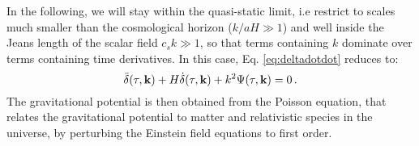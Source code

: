 In the following, we will stay within the quasi-static
limit, i.e restrict to scales much smaller than the cosmological horizon
($k/aH\gg1$) and well inside the Jeans length of the scalar field
$c_{s}k\gg1$, so that terms containing $k$ dominate over terms containing
time derivatives. In this case, Eq. \ref{eq:deltadotdot} reduces
to: 
\begin{equation}
\ddot{\delta}(\tau,\mathbf{k})+H\dot{\delta}(\tau,\mathbf{k})+k^{2}\Psi(\tau,\mathbf{k})=0\,.\label{eq:growth-rate-Psi}
\end{equation}
The gravitational potential is then obtained from the Poisson equation,
that relates the gravitational potential to matter and relativistic
species in the universe, by perturbing the Einstein field equations
to first order.

